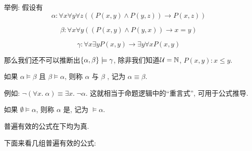 举例: 假设有
\[
  \alpha: \forall x \forall y \forall z ((P(x, y) \land P(y, z)) \to P(x, z))
\]

\[
  \beta: \forall x \forall y ((P(x, y) \land P(y, x)) \to x = y)
\]

\[
  \gamma: \forall x \exists y P(x, y) \to \exists y \forall x P(x, y)
\]

那么我们还不可以推断出$\{\alpha, \beta\} \models \gamma$, 除非我们知道$\mathcal{U} = \mathbb{N}$,  $P(x, y): x \le y$. 

\begin{definition}
  如果 $\alpha \models \beta$ 且 $\beta \models \alpha$,
  则称 $\alpha$ 与 $\beta$ , 记为 $\alpha \equiv \beta$. 
\end{definition}

例如: $\lnot (\forall x.\; \alpha) \equiv \exists x.\; \lnot \alpha$. 这就相当于命题逻辑中的``重言式'', 可用于公式推导. 

\begin{definition}
  如果 $\emptyset \models \alpha$, 则称 $\alpha$ 是,
  记为 $\models \alpha$. 
\end{definition}

普遍有效的公式在下均为真. 

下面来看几组普遍有效的公式: 

